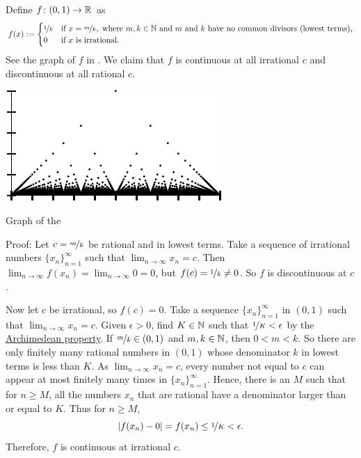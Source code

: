\begin{example} \label{popcornfunction:example}
Define $f \colon (0,1) \to {\mathbb{R}}$ as
\begin{equation*}
f(x) := 
\begin{cases}
\nicefrac{1}{k} & \text{if } x=\nicefrac{m}{k}, \text{ where } m,k \in {\mathbb{N}}
\text{ and } m \text{ and } k \text{ have no common divisors (lowest terms),} \\
0 & \text{if } x \text{ is irrational.}
\end{cases}
\end{equation*}
See the graph of $f$
in .
We claim that
$f$ is continuous at all irrational $c$ and 
discontinuous at all rational $c$.
\begin{myfigureht}
\includegraphics{figures/popcornfig}
\caption{Graph of the \label{popcornfig}}
\end{myfigureht}

Proof:
Let $c = \nicefrac{m}{k}$ be rational and in lowest terms.  Take a sequence of
irrational numbers $\{ x_n \}_{n=1}^\infty$ such that $\lim_{n\to\infty} x_n = c$.  Then
$\lim_{n\to\infty} f(x_n) = \lim_{n\to\infty} 0 = 0$, but $f(c) = \nicefrac{1}{k} \not= 0$.  So $f$
is discontinuous at $c$.

Now let $c$ be irrational, so $f(c) = 0$.  Take a sequence 
$\{ x_n \}_{n=1}^\infty$ in $(0,1)$ such that $\lim_{n\to\infty} x_n = c$.
Given $\epsilon > 0$, find $K \in {\mathbb{N}}$ such
that $\nicefrac{1}{K} < \epsilon$
by the \hyperref[thm:arch:i]{Archimedean property}.
If $\nicefrac{m}{k} \in (0,1)$ and $m,k \in {\mathbb{N}}$, then $0 < m < k$.
So there are only finitely many rational numbers in $(0,1)$
whose denominator $k$ in lowest terms is less than $K$.
As $\lim_{n\to\infty} x_n = c$, every number not equal to $c$ can appear at most
finitely many times in $\{ x_n \}_{n=1}^\infty$.
Hence,
there is an $M$ such that for $n \geq M$, all the numbers $x_n$
that are rational
have a denominator larger than or equal to $K$.  Thus for $n \geq M$,
\begin{equation*}
\left\lvert {f(x_n) - 0} \right\rvert = f(x_n) \leq \nicefrac{1}{K} < \epsilon .
\end{equation*}
Therefore, $f$ is continuous at irrational $c$.
\end{example}

